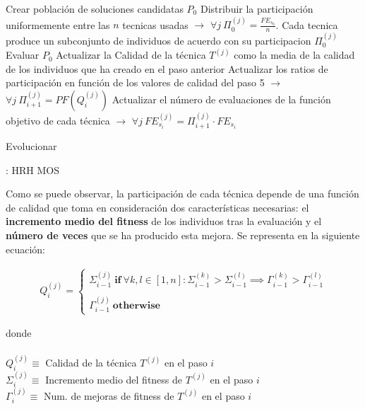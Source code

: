 \begin{algorithm}[H]
	\begin{algorithmic}[1]
		\STATE Crear población de soluciones candidatas $P_0$
		\STATE Distribuir la participación uniformemente entre las $n$ tecnicas usadas $\rightarrow$ $\forall j \ \Pi_{0}^{(j)} = \frac{FE_{s_{0}}}{n}$. Cada tecnica produce un subconjunto de individuos de acuerdo con su participacion $ \Pi_{0}^{(j)}$
		\STATE Evaluar $P_0$
		\STATE Actualizar la Calidad de la técnica $T^{(j)}$ como la media de la calidad de los individuos que ha creado en el paso anterior
		\STATE Actualizar los ratios de participación en función de los valores de calidad del paso 5 $\rightarrow$ $\forall j \ \Pi_{i+1}^{(j)} = PF(Q_i^{(j)})$
		\STATE Actualizar el número de evaluaciones de la función objetivo de cada técnica $\rightarrow$ $\forall j \ FE_{s_i}^{(j)} = \Pi_{i+1}^{(j)} \cdot FE_{s_i}$		
		
				\STATE Evolucionar
			\ENDWHILE
		\ENDFOR
		\ENDWHILE		
	\end{algorithmic}
	\caption{: HRH MOS } \label{Alg: MOS HRH}
\end{algorithm}

Como se puede observar, la participación de cada técnica depende de una función de calidad que toma en consideración dos características necesarias: el \textbf{incremento medio del fitness} de los individuos tras la evaluación y el \textbf{número de veces} que se ha producido esta mejora. Se representa en la siguiente ecuación:

\begin{equation}\label{eq:QF_MOS}
	\begin{gathered}
		Q_i^{(j)} = 
						\begin{cases}
							\Sigma_{i-1}^{(j)} \ \textbf{if}  \ \forall k,l \in [1,n]: \Sigma_{i-1}^{(k)} > \Sigma_{i-1}^{(l)} \implies \Gamma_{i-1}^{(k)} > \Gamma_{i-1}^{(l)} \\ \\
							\Gamma_{i-1}^{(j)} \ \textbf{otherwise}
						\end{cases}
	\end{gathered}
\end{equation}

donde \\ \\
$Q_i^{(j)} \equiv$ Calidad de la técnica $T^{(j)}$ en el paso $i$\\
$\Sigma_i^{(j)} \equiv$ Incremento medio del fitness de $T^{(j)}$ en el paso $i$\\
$\Gamma_i^{(j)} \equiv$ Num. de mejoras de fitness de $T^{(j)}$ en el paso $i$	

